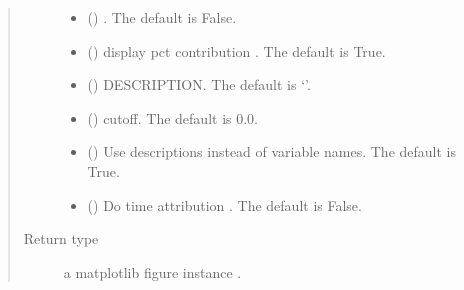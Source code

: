 \documentclass[letterpaper,10pt,english]{sphinxmanual}
\begin{document}
\begin{fulllineitems}
\begin{fulllineitems}
\begin{quote}
\begin{description}
\begin{itemize}
\item {} 
\sphinxAtStartPar
{} (\sphinxstyleliteralemphasis{\sphinxupquote{, }}) \textendash{} . The default is False.

\item {} 
\sphinxAtStartPar
{} (\sphinxstyleliteralemphasis{\sphinxupquote{, }}) \textendash{} display pct contribution . The default is True.

\item {} 
\sphinxAtStartPar
{} (\sphinxstyleliteralemphasis{\sphinxupquote{, }}) \textendash{} DESCRIPTION. The default is ‘’.

\item {} 
\sphinxAtStartPar
{} (\sphinxstyleliteralemphasis{\sphinxupquote{, }}) \textendash{} cutoff. The default is 0.0.

\item {} 
\sphinxAtStartPar
{} (\sphinxstyleliteralemphasis{\sphinxupquote{, }}) \textendash{} Use descriptions instead of variable names. The default is True.

\item {} 
\sphinxAtStartPar
{} (\sphinxstyleliteralemphasis{\sphinxupquote{, }}) \textendash{} Do time attribution . The default is False.

\end{itemize}

\item[{Return type}] \leavevmode
\sphinxAtStartPar
a matplotlib figure instance .

\end{description}\end{quote}

\end{fulllineitems}


\end{fulllineitems}
\end{document}
